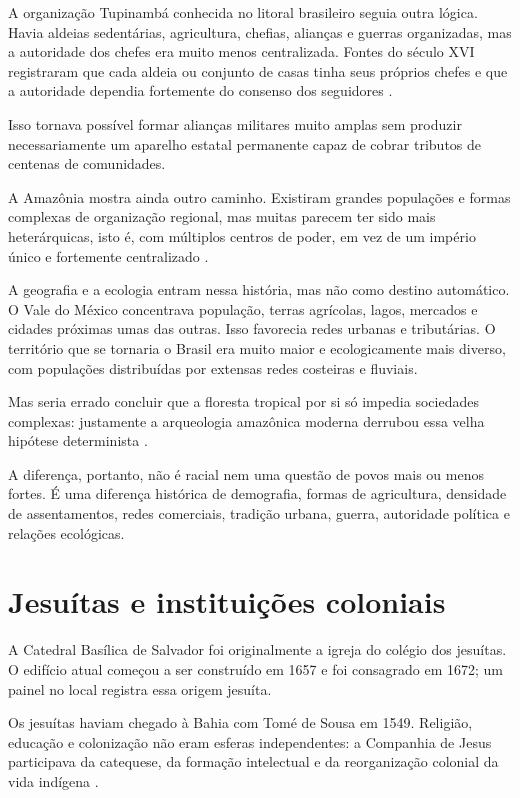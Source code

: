 A organização Tupinambá conhecida no litoral
brasileiro seguia outra lógica. Havia
aldeias sedentárias, agricultura, chefias,
alianças e guerras organizadas, mas a
autoridade dos chefes era muito menos
centralizada. Fontes do século XVI
registraram que cada aldeia ou conjunto de
casas tinha seus próprios chefes e que a
autoridade dependia fortemente do consenso
dos seguidores \cite{monteiro2018}.

Isso tornava possível formar alianças
militares muito amplas sem produzir
necessariamente um aparelho estatal
permanente capaz de cobrar tributos de
centenas de comunidades.

A Amazônia mostra ainda outro caminho.
Existiram grandes populações e formas
complexas de organização regional, mas
muitas parecem ter sido mais
heterárquicas, isto é, com múltiplos centros
de poder, em vez de um império único e
fortemente centralizado
\cite{roosevelt1999amazonia}.

A geografia e a ecologia entram nessa
história, mas não como destino automático.
O Vale do México concentrava população,
terras agrícolas, lagos, mercados e
cidades próximas umas das outras. Isso
favorecia redes urbanas e tributárias. O
território que se tornaria o Brasil era
muito maior e ecologicamente mais diverso,
com populações distribuídas por extensas
redes costeiras e fluviais.

Mas seria errado concluir que a floresta
tropical por si só impedia sociedades
complexas: justamente a arqueologia
amazônica moderna derrubou essa velha
hipótese determinista
\cite{gomes2018indigenous,
roosevelt1999amazonia}.

A diferença, portanto, não é racial nem
uma questão de povos mais ou menos fortes.
É uma diferença histórica de demografia,
formas de agricultura, densidade de
assentamentos, redes comerciais, tradição
urbana, guerra, autoridade política e
relações ecológicas.

\section{Jesuítas e instituições coloniais}
\label{section-historia-jesuitas-salvador}

A Catedral Basílica de Salvador foi
originalmente a igreja do colégio
dos jesuítas. O edifício atual começou a ser
construído em 1657 e foi
consagrado em 1672; um painel no local
registra essa origem jesuíta.

Os jesuítas haviam chegado à Bahia com Tomé
de Sousa em 1549. Religião,
educação e colonização não eram esferas
independentes: a Companhia de Jesus
participava da catequese, da formação
intelectual e da reorganização colonial
da vida indígena \cite{jesuitas1549}.

